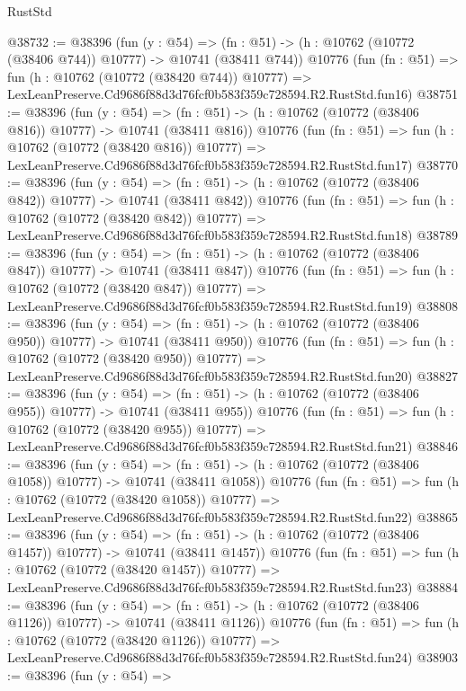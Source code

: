 \begin{lexlean}{RustStd}
\begin{coremodule}
@38732 := @38396
    (fun (y : @54) =>
    (fn : @51) -> (h : @10762 (@10772 (@38406 @744)) @10777) -> @10741 (@38411 @744))
    @10776
    (fun (fn : @51) =>
    fun (h : @10762 (@10772 (@38420 @744)) @10777) =>
    LexLeanPreserve.Cd9686f88d3d76fcf0b583f359c728594.R2.RustStd.fun16)
@38751 := @38396
    (fun (y : @54) =>
    (fn : @51) -> (h : @10762 (@10772 (@38406 @816)) @10777) -> @10741 (@38411 @816))
    @10776
    (fun (fn : @51) =>
    fun (h : @10762 (@10772 (@38420 @816)) @10777) =>
    LexLeanPreserve.Cd9686f88d3d76fcf0b583f359c728594.R2.RustStd.fun17)
@38770 := @38396
    (fun (y : @54) =>
    (fn : @51) -> (h : @10762 (@10772 (@38406 @842)) @10777) -> @10741 (@38411 @842))
    @10776
    (fun (fn : @51) =>
    fun (h : @10762 (@10772 (@38420 @842)) @10777) =>
    LexLeanPreserve.Cd9686f88d3d76fcf0b583f359c728594.R2.RustStd.fun18)
@38789 := @38396
    (fun (y : @54) =>
    (fn : @51) -> (h : @10762 (@10772 (@38406 @847)) @10777) -> @10741 (@38411 @847))
    @10776
    (fun (fn : @51) =>
    fun (h : @10762 (@10772 (@38420 @847)) @10777) =>
    LexLeanPreserve.Cd9686f88d3d76fcf0b583f359c728594.R2.RustStd.fun19)
@38808 := @38396
    (fun (y : @54) =>
    (fn : @51) -> (h : @10762 (@10772 (@38406 @950)) @10777) -> @10741 (@38411 @950))
    @10776
    (fun (fn : @51) =>
    fun (h : @10762 (@10772 (@38420 @950)) @10777) =>
    LexLeanPreserve.Cd9686f88d3d76fcf0b583f359c728594.R2.RustStd.fun20)
@38827 := @38396
    (fun (y : @54) =>
    (fn : @51) -> (h : @10762 (@10772 (@38406 @955)) @10777) -> @10741 (@38411 @955))
    @10776
    (fun (fn : @51) =>
    fun (h : @10762 (@10772 (@38420 @955)) @10777) =>
    LexLeanPreserve.Cd9686f88d3d76fcf0b583f359c728594.R2.RustStd.fun21)
@38846 := @38396
    (fun (y : @54) =>
    (fn : @51) -> (h : @10762 (@10772 (@38406 @1058)) @10777) -> @10741 (@38411 @1058))
    @10776
    (fun (fn : @51) =>
    fun (h : @10762 (@10772 (@38420 @1058)) @10777) =>
    LexLeanPreserve.Cd9686f88d3d76fcf0b583f359c728594.R2.RustStd.fun22)
@38865 := @38396
    (fun (y : @54) =>
    (fn : @51) -> (h : @10762 (@10772 (@38406 @1457)) @10777) -> @10741 (@38411 @1457))
    @10776
    (fun (fn : @51) =>
    fun (h : @10762 (@10772 (@38420 @1457)) @10777) =>
    LexLeanPreserve.Cd9686f88d3d76fcf0b583f359c728594.R2.RustStd.fun23)
@38884 := @38396
    (fun (y : @54) =>
    (fn : @51) -> (h : @10762 (@10772 (@38406 @1126)) @10777) -> @10741 (@38411 @1126))
    @10776
    (fun (fn : @51) =>
    fun (h : @10762 (@10772 (@38420 @1126)) @10777) =>
    LexLeanPreserve.Cd9686f88d3d76fcf0b583f359c728594.R2.RustStd.fun24)
@38903 := @38396
    (fun (y : @54) =>

\end{coremodule}
\end{lexlean}
